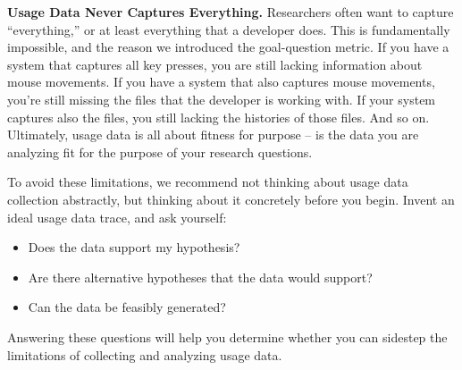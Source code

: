 \textbf{Usage Data Never Captures Everything.}
Researchers often want to capture ``everything,'' or at least 
everything that a developer does.
This is fundamentally impossible, and the reason we introduced the 
goal-question metric.
If you have a system that captures all key presses, you are still 
lacking information about mouse movements.
If you have a system that also captures mouse movements, you're still
missing the files that the developer is working with.
If your system captures also the files, you still lacking the 
histories of those files.
And so on.
Ultimately, usage data is all about fitness for purpose -- is the data
you are analyzing fit for the purpose of your research questions.

To avoid these limitations, we recommend not thinking about 
usage data collection abstractly, but thinking about it concretely before
you begin.
Invent an ideal usage data trace, and ask yourself:

\begin{itemize}
  \item Does the data support my hypothesis?
  \item Are there alternative hypotheses that the data would support?
  \item Can the data be feasibly generated?
\end{itemize}

\noindent
Answering these questions will help you determine whether you can sidestep
the limitations of collecting and analyzing usage data.

